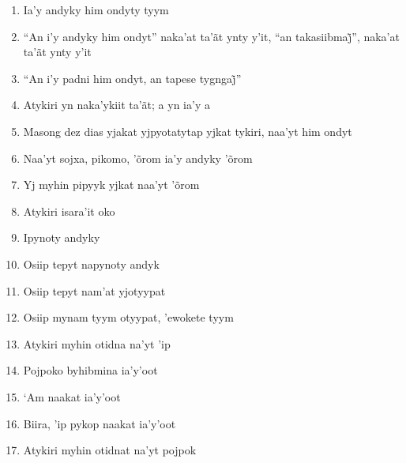 \begin{enumerate}
 \begin{center}\end{center}

 \item Ia'y andyky him ondyty tyym

 \item ``An i’y andyky him ondyt'' naka’at ta’ãt ynty y’it, ``an takasiibmaj̃'', naka’at ta’ãt ynty y’it

 \item ``An i’y padni him ondyt, an tapese tygngaj̃''

 \item Atykiri yn naka'ykiit ta'ãt; a yn ia'y a

 \item Masong dez dias yjakat yjpyotatytap yjkat tykiri, naa'yt him ondyt

 \item Naa'yt sojxa, pikomo, 'õrom ia'y andyky 'õrom

 \item Yj myhin pipyyk yjkat naa'yt 'õrom

 \item Atykiri isara'it oko

 \begin{center}\end{center}


 \item Ipynoty andyky

 \item Osiip tepyt napynoty andyk

 \item Osiip tepyt nam'at yjotyypat

 \item Osiip mynam tyym otyypat, 'ewokete tyym

 \begin{center}\end{center}

 \item Atykiri myhin otidna na'yt 'ip

 \item Pojpoko byhibmina ia'y'oot

 \item `Am naakat ia'y'oot

 \item Biira, 'ip pykop naakat ia'y'oot

 \item Atykiri myhin otidnat na'yt pojpok


\end{enumerate}
